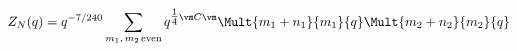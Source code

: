 \begin{equation}
Z_N(q) = q^{-7/240}
\sum_{
m_1,\,m_2\,\text{even}}
q^{\tfrac{1}{4}\vm C\vm}
\Mult{m_1+n_1}{m_1}{q}\Mult{m_2+n_2}{m_2}{q}
\end{equation}

